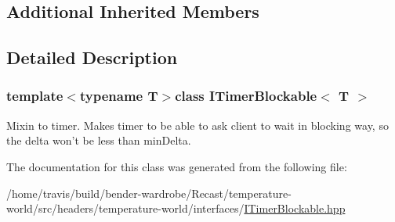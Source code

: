 \subsection*{Additional Inherited Members}


\subsection{Detailed Description}
\subsubsection*{template$<$typename T$>$class I\-Timer\-Blockable$<$ T $>$}

Mixin to timer. Makes timer to be able to ask client to wait in blocking way, so the {\ttfamily delta} won't be less than {\ttfamily min\-Delta}. 

The documentation for this class was generated from the following file\-:\begin{DoxyCompactItemize}
\item 
/home/travis/build/bender-\/wardrobe/\-Recast/temperature-\/world/src/headers/temperature-\/world/interfaces/\hyperlink{_i_timer_blockable_8hpp}{I\-Timer\-Blockable.\-hpp}\end{DoxyCompactItemize}

